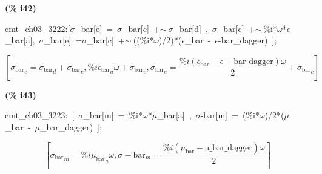 \documentclass[fleqn]{article}
\begin{document}
\noindent
\begin{minipage}[t]{4.000000em}\color{red}\bfseries
(\% i42)	
\end{minipage}
\begin{minipage}[t]{\textwidth}\color{blue}
cmt\_ch03\_3222:[\ensuremath{\sigma}\_bar[e]\ =\ \ensuremath{\sigma}\_bar[c]\ +\ensuremath{\sim\ }\ensuremath{\sigma}\_bar[d]\ ,\ \ensuremath{\sigma}\_bar[c]\ +\ensuremath{\sim\ }\%i*\ensuremath{\omega}*\ensuremath{\epsilon}\_bar[a],\ \ensuremath{\sigma}\_bar[e]\ =\ensuremath{\sigma}\_bar[c]\ +\ensuremath{\sim\ }((\%i*\ensuremath{\omega})/2)*(\ensuremath{\epsilon}\_bar\ -\ \ensuremath{\epsilon}-bar\_dagger)\ ];
\end{minipage}
\[\displaystyle \tag{cmt\_ ch03\_ 3222} 
\left[ {{{{\sigma }_{\ensuremath{\mathrm{bar}}}}}_e}={{{{\sigma }_{\ensuremath{\mathrm{bar}}}}}_d}+{{{{\sigma }_{\ensuremath{\mathrm{bar}}}}}_c}\operatorname{,}\% i {{{{\epsilon }_{\ensuremath{\mathrm{bar}}}}}_a} \omega +{{{{\sigma }_{\ensuremath{\mathrm{bar}}}}}_c}\operatorname{,}{{{{\sigma }_{\ensuremath{\mathrm{bar}}}}}_e}=\frac{\% i \left( {{\epsilon }_{\ensuremath{\mathrm{bar}}}}-\epsilon -\ensuremath{\mathrm{bar\_ dagger}}\right)  \omega }{2}+{{{{\sigma }_{\ensuremath{\mathrm{bar}}}}}_c}\right] \mbox{}
\]


\noindent
\begin{minipage}[t]{4.000000em}\color{red}\bfseries
(\% i43)	
\end{minipage}
\begin{minipage}[t]{\textwidth}\color{blue}
cmt\_ch03\_3223:\ [\ \ensuremath{\sigma}\_bar[m]\ =\ \%i*\ensuremath{\omega}*\ensuremath{\mu}\_bar[a]\ ,\ \ensuremath{\sigma}-bar[m]\ =\ (\%i*\ensuremath{\omega})/2*(\ensuremath{\mu}\_bar\ -\ \ensuremath{\mu}\_bar\_dagger)\ ];
\end{minipage}
\[\displaystyle \tag{cmt\_ ch03\_ 3223} 
\left[ {{{{\sigma }_{\ensuremath{\mathrm{bar}}}}}_m}=\% i {{{{\mu }_{\ensuremath{\mathrm{bar}}}}}_a} \omega \operatorname{,}\sigma -{{\ensuremath{\mathrm{bar}}}_m}=\frac{\% i \left( {{\mu }_{\ensuremath{\mathrm{bar}}}}-\ensuremath{\mathrm{\mu \_ bar\_ dagger}}\right)  \omega }{2}\right] \mbox{}
\]
\end{document}

